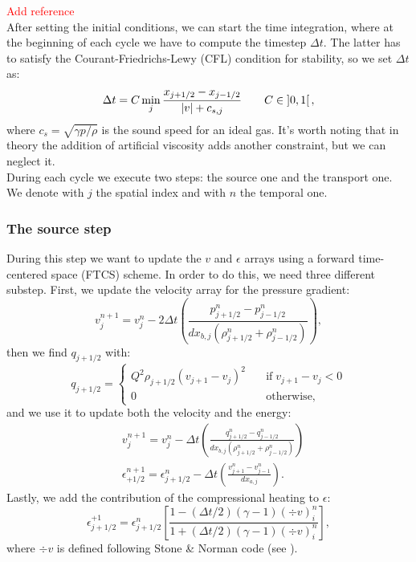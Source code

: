 \documentclass{article}
\begin{document}
\textcolor{red}{Add reference}\\

After setting the initial conditions, we can start the time integration, where at the beginning of each cycle we have to compute the timestep $\Delta t$. The latter has to satisfy the Courant-Friedrichs-Lewy (CFL) condition for stability, so we set $\Delta t$ as:
\begin{equation}
	\Delta t=C\min_{j}{\frac{x_{j+1/2}-x_{j-1/2}}{\abs{v}+c_{s,j}}} \qquad C\in \left]0,1\right[,
\end{equation}
where $c_s=\sqrt{\gamma p/\rho}$ is the sound speed for an ideal gas. It's worth noting that in theory the addition of artificial viscosity adds another constraint, but we can neglect it. \\
During each cycle we execute two steps: the source one and the transport one. We denote with $j$ the spatial index and with $n$ the temporal one.
\subsubsection{The source step}
During this step we want to update the $v$ and $\epsilon$ arrays using a forward time-centered space (FTCS) scheme. In order to do this, we need three different substep. First, we update the velocity array for the pressure gradient:
\begin{equation}
	v_{j}^{n+1}=v_{j}^n-2\Delta t\left(\frac{p_{j+1/2}^n-p_{j-1/2}^n}{dx_{b,j}(\rho_{j+1/2}^n+\rho_{j-1/2}^n)}\right),
\end{equation}
then we find $q_{j+1/2}$ with:
\begin{equation}
	q_{j+1/2}=
	\begin{cases}
		Q^{2}\rho_{j+1/2}(v_{j+1}-v_j)^2 \quad &\text{if} \; v_{j+1}-v_j<0\\
		0 \quad &\text{otherwise},
	\end{cases}
\end{equation}
and we use it to update both the velocity and the energy:
\begin{align}
	&v_j^{n+1}=v_j^n-\Delta t\left(\frac{q_{j+1/2}^n-q_{j-1/2}^n}{dx_{b,j}(\rho_{j+1/2}^n+\rho_{j-1/2}^n)}\right)\\
	&\epsilon_{+1/2}^{n+1}=\epsilon_{j+1/2}^n-\Delta t\left(\frac{v_{j+1}^n-v_{j-1}^n}{dx_{a,j}}\right).
\end{align}
Lastly, we add the contribution of the compressional heating to $\epsilon$:
\begin{equation}
	\epsilon^{+1}_{j+1/2}=\epsilon^n_{j+1/2}\left[\frac{1-(\Delta t/2)(\gamma -1)(\div{v})_i^n}{1+(\Delta t/2)(\gamma -1)(\div{v})_i^n}\right],
\end{equation}
where $\div{v}$ is defined following Stone \& Norman code (see \cite{stone}).
\end{document}
